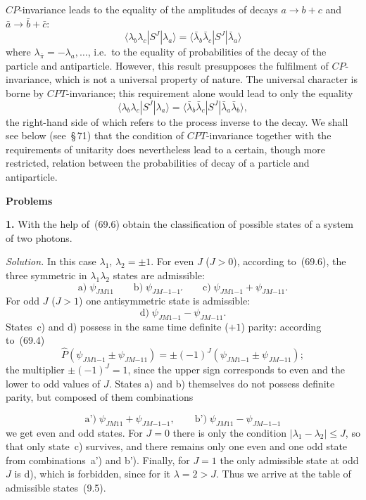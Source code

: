 $CP$-invariance leads to the equality of the amplitudes of decays $a \to b + c$ and $\bar{a} \to \bar{b} + \bar{c}$:
\begin{equation}
\langle\lambda_b\lambda_c|S^J|\lambda_a\rangle = \langle\bar{\lambda}_b\bar{\lambda}_c|S^J|\bar{\lambda}_a\rangle
\tag{69.14}
\end{equation}
where $\lambda_{\bar{\pi}} = -\lambda_a, \ldots$, i.e.\ to the equality of probabilities of the decay of the particle and antiparticle. However, this result presupposes the fulfilment of $CP$-invariance, which is not a universal property of nature. The universal character is borne by $CPT$-invariance; this requirement alone would lead to only the equality
\[
\langle\lambda_b\lambda_c|S^J|\lambda_a\rangle = \langle\bar{\lambda}_b\bar{\lambda}_c|S^J|\bar{\lambda}_a\bar{\lambda}_b\rangle,
\]
the right-hand side of which refers to the process inverse to the decay. We shall see below (see~\S\,71) that the condition of $CPT$-invariance together with the requirements of unitarity does nevertheless lead to a certain, though more restricted, relation between the probabilities of decay of a particle and antiparticle.

\bigskip
\begin{center}\textbf{Problems}\end{center}
\smallskip
\textbf{1.} With the help of~(69.6) obtain the classification of possible states of a system of two photons.

\textit{Solution.} In this case $\lambda_1$, $\lambda_2 = \pm 1$. For even $J$ ($J > 0$), according to~(69.6), the three symmetric in $\lambda_1\lambda_2$ states are admissible:
\[
\text{a)}\;\psi_{JM11}\qquad \text{b)}\;\psi_{JM{-1}{-1}'}\qquad \text{c)}\;\psi_{JM1{-1}} + \psi_{JM{-1}1}.
\]
For odd $J$ ($J > 1$) one antisymmetric state is admissible:
\[
\text{d)}\;\psi_{JM1{-1}} - \psi_{JM{-1}1}.
\]
States~c) and d) possess in the same time definite ($+1$) parity: according to~(69.4)
\[
\hat{P}(\psi_{JM1{-1}} \pm \psi_{JM{-1}1}) = \pm(-1)^J(\psi_{JM1{-1}} \pm \psi_{JM{-1}1});
\]
the multiplier $\pm(-1)^J = 1$, since the upper sign corresponds to even and the lower to odd values of $J$. States a) and b) themselves do not possess definite parity, but composed of them combinations

\[
\text{a')}\;\psi_{JM11} + \psi_{JM{-1}{-1}},\qquad \text{b')}\;\psi_{JM11} - \psi_{JM{-1}{-1}}
\]
we get even and odd states. For $J = 0$ there is only the condition $|\lambda_1 - \lambda_2| \leqslant J$, so that only state~c) survives, and there remains only one even and one odd state from combinations~a') and b'). Finally, for $J = 1$ the only admissible state at odd $J$ is d), which is forbidden, since for it $\lambda = 2 > J$. Thus we arrive at the table of admissible states~(9.5).

